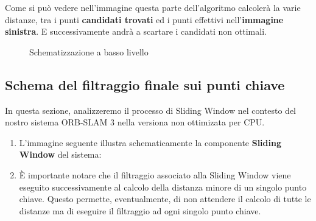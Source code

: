 \documentclass[12pt,a4paper]{report}
\begin{document}
Come si può vedere nell'immagine questa parte dell'algoritmo calcolerà la varie distanze, tra i punti \textbf{candidati trovati} ed i punti effettivi nell'\textbf{immagine sinistra}.
E successivamente andrà a scartare i candidati non ottimali.



\begin{figure}[H]
    \centering
    \caption{Schematizzazione a basso livello}
\end{figure}

\subsection{Schema del filtraggio finale sui punti chiave}

In questa sezione, analizzeremo il processo di Sliding Window nel contesto del nostro sistema ORB-SLAM 3 nella versiona non ottimizata per CPU. 

\begin{enumerate}
    \item L'immagine seguente illustra schematicamente la componente \textbf{Sliding Window} del sistema:
    
    \item È importante notare che il filtraggio associato alla Sliding Window viene eseguito successivamente al calcolo della distanza minore di un singolo punto chiave. Questo permette, eventualmente, di non attendere il calcolo di tutte le distanze ma di eseguire il filtraggio ad ogni singolo punto chiave.
\end{enumerate}
\end{document}
